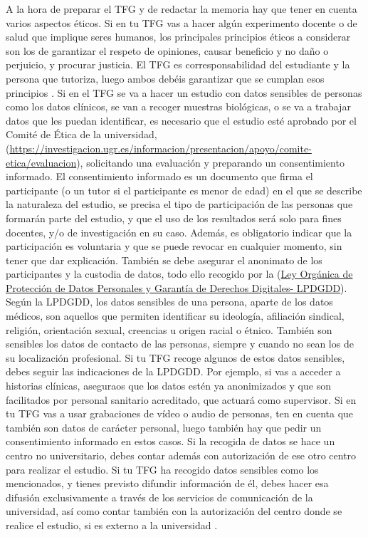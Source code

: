 A la hora de preparar el TFG y de redactar la memoria hay que tener en cuenta varios aspectos éticos.
Si en tu TFG vas a hacer algún experimento docente o de salud que implique seres humanos, los principales principios éticos a considerar son los de garantizar el respeto de opiniones, causar beneficio y no daño o perjuicio, y procurar justicia. El TFG es corresponsabilidad del estudiante y la persona que tutoriza, luego ambos debéis garantizar que se cumplan esos principios \cite{EticaCantabria}. 
Si en el TFG se va a hacer un estudio con datos sensibles de personas como los datos clínicos, se van a recoger muestras biológicas, o se va a trabajar datos que les puedan identificar, es necesario que el estudio esté aprobado por el Comité de Ética de la universidad, (\url{https://investigacion.ugr.es/informacion/presentacion/apoyo/comite-etica/evaluacion}), solicitando una evaluación y preparando un consentimiento informado. El consentimiento informado es un documento que firma el participante (o un tutor si el participante es menor de edad) en el que se describe la naturaleza del estudio, se precisa el tipo de participación de las personas que formarán parte del estudio, y que el uso de los resultados será solo para fines docentes, y/o de investigación en su caso. Además, es obligatorio indicar que la participación es voluntaria y que se puede revocar en cualquier momento, sin tener que dar explicación. También se debe asegurar el anonimato de los participantes y la custodia de datos, todo ello recogido por la (\href{https://www.boe.es/buscar/act.php?id=BOE-A-2018-16673}{Ley Orgánica de Protección de Datos Personales y Garantía de Derechos Digitales- LPDGDD}). 
Según la LPDGDD, los datos sensibles de una persona, aparte de los datos médicos, son aquellos que permiten identificar su ideología, afiliación sindical, religión, orientación sexual, creencias u origen racial o étnico. También son sensibles los datos de contacto de las personas, siempre y cuando no sean los de su localización profesional. Si tu TFG recoge algunos de estos datos sensibles, debes seguir las indicaciones de la LPDGDD. Por ejemplo, si vas a acceder a historias clínicas, aseguraos que los datos estén ya anonimizados y que son facilitados por personal sanitario acreditado, que actuará como supervisor. Si en tu TFG vas a usar grabaciones de vídeo o audio de personas, ten en cuenta que también son datos de carácter personal, luego también hay que pedir un consentimiento informado en estos casos. Si la recogida de datos se hace un centro no universitario, debes contar además con autorización de ese otro centro para realizar el estudio.
Si tu TFG ha recogido datos sensibles como los mencionados, y tienes previsto difundir información de él, debes hacer esa difusión exclusivamente a través de los servicios de comunicación de la universidad, así como contar también con la autorización del centro donde se realice el estudio, si es externo a la universidad \cite{EticaUGR}.

